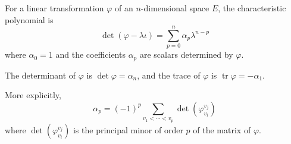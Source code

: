 For a linear transformation $\varphi$ of an $n$-dimensional space $E$, the characteristic polynomial is
$$\det(\varphi - \lambda\iota) = \sum_{p=0}^{n} \alpha_p \lambda^{n-p}$$
where $\alpha_0 = 1$ and the coefficients $\alpha_p$ are scalars determined by $\varphi$.

The determinant of $\varphi$ is $\det \varphi = \alpha_n$, and the trace of $\varphi$ is $\operatorname{tr} \varphi = -\alpha_1$.

More explicitly,
$$\alpha_p = (-1)^p \sum_{v_1 < \cdots < v_p} \det(\varphi_{v_i}^{v_j})$$
where $\det(\varphi_{v_i}^{v_j})$ is the principal minor of order $p$ of the matrix of $\varphi$.
